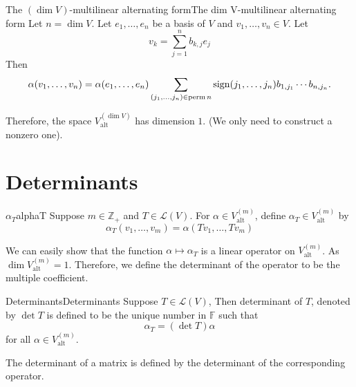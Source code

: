 \documentclass[../main.tex]{subfiles}
\begin{document}
\begin{theorem}{The $(\dim V)$-multilinear alternating form}{The dim V-multilinear alternating form}
Let $n=\dim V$. Let $e_1, \ldots ,e_n$ be a basis of $V$ and $v_1, \ldots ,v_n\in V$. Let
\begin{equation*}
v_k = \sum_{j=1}^{n} b _{k,j}e_j
\end{equation*}
Then
\begin{equation*}
	\alpha(v_1, \ldots ,v_n) = \alpha(e_1, \ldots ,e_n) \sum_{(j_1, \ldots ,j_n)\in \operatorname{perm} n} \operatorname{sign} (j_1, \ldots ,j_n) b _{1,j_1} \cdots b _{n,j_n}.
\end{equation*}
\end{theorem}

Therefore, the space $V_{\text{alt}}^{(\dim V)}$ has dimension $1$. (We only need to construct a nonzero one).

\section{Determinants}

\begin{notation}{$\alpha_T$}{alphaT}
Suppose $m\in \mathbb{Z}_+$ and $T\in \mathscr{L}(V)$. For  $\alpha\in V_{\text{alt}}^{(m)}$, define $\alpha_T\in V_{\text{alt}}^{(m)}$ by
\begin{equation*}
\alpha_T(v_1, \ldots ,v_m) = \alpha(Tv_1, \ldots ,Tv_m)
\end{equation*}
\end{notation}

\begin{remark}
We can easily show that the function $\alpha \mapsto \alpha_T$ is a linear operator on $V_{\text{alt}}^{(m)}$. As $\dim V_{\text{alt}}^{(m)} = 1$. Therefore, we define the determinant of the operator to be the multiple coefficient.
\end{remark}

\begin{definition}{Determinants}{Determinants}
Suppose $T\in \mathscr{L}(V)$, Then determinant of $T$, denoted by $\det T$ is defined to be the unique number in $\mathbb{F}$ such that
\begin{equation*}
\alpha_T = (\det T) \alpha
\end{equation*}
for all $\alpha\in V_{\text{alt}}^{(m)}$.

The determinant of a matrix is defined by the determinant of the corresponding operator.
\end{definition}
\end{document}
